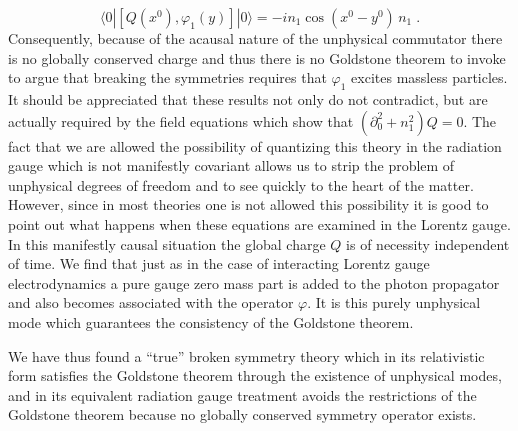 \documentclass[%
  12pt,
  paper=letter,
  abstracton,
  pagesize=auto,
  version=last,
  DIV=calc
  ]{scrartcl}
\begin{document}
\[\langle 0|[Q(x^0), \varphi_1(y)]|0\rangle =-i n_1\cos(x^0-y^0)\,n_1 \;.\]
Consequently, because of the acausal nature of the
unphysical commutator there is no globally conserved charge and thus
there is no Goldstone theorem to invoke to argue that breaking the
symmetries requires that $\varphi_1$ excites massless particles.  It
should be appreciated that these results not only do not contradict,
but are actually required by the field equations which show that
$(\partial^2_0+n^2_1)Q=0$.  The fact that we are allowed the possibility
of quantizing this theory in the radiation gauge which is not
manifestly covariant allows us to strip the problem of unphysical
degrees of freedom and to see quickly to the heart of the matter.
However, since in most theories one is not allowed this possibility it
is good to point out what happens when these equations are examined in
the Lorentz gauge.  In this manifestly causal situation the global
charge $Q$ is of necessity independent of time.  We find that just as
in the case of interacting Lorentz gauge electrodynamics a pure gauge
zero mass part is added to the photon propagator and also becomes
associated with the operator $\varphi$.  It is this purely unphysical
mode which guarantees the consistency of the Goldstone theorem.

We have thus found a ``true'' broken symmetry theory which in its
relativistic form satisfies the Goldstone theorem through the
existence of unphysical modes, and in its equivalent radiation gauge
treatment avoids the restrictions of the Goldstone theorem because no
globally conserved symmetry operator exists.
\end{document}
